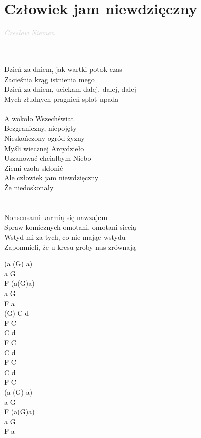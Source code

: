 \documentclass[a5paper, 10pt]{book}
\begin{document}
\section{Człowiek jam niewdzięczny}\textcolor{lightgray}{\textit{Czesław Niemen}}\\~\\
\begin{minipage}[t]{0.6\textwidth}
~\\
Dzień za dniem, jak wartki potok czas\\
Zacieśnia krąg istnienia mego\\
Dzień za dniem, uciekam dalej, dalej, dalej\\
Mych złudnych pragnień splot upada\\
\\
\hspace*{5mm}A wokoło Wszechświat\\
\hspace*{5mm}Bezgraniczny, niepojęty\\
\hspace*{5mm}Nieskończony ogród żyzny\\
\hspace*{5mm}Myśli wiecznej Arcydzieło\\
\hspace*{5mm}Uszanować chciałbym Niebo\\
\hspace*{5mm}Ziemi czoła skłonić\\
\hspace*{5mm}Ale człowiek jam niewdzięczny\\
\hspace*{5mm}Że niedoskonały\\
\\
~\\
Nonsensami karmią się nawzajem\\
Spraw komicznych omotani, omotani siecią\\
Wstyd mi za tych, co nie mając wstydu\\
Zapomnieli, że u kresu groby nas zrównają\\
\end{minipage}
\begin{minipage}[t]{0.4\textwidth}
(a (G) a)\\
a G\\F (a(G)a)\\
a G\\F a\\

(G) C d\\F C\\C d\\F C\\
C d\\F C\\C d\\F C\\

(a (G) a)\\
a G\\F (a(G)a)\\
a G\\F a\\
\end{minipage}
\end{document}
